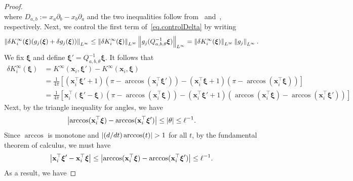 \begin{proof}
\begin{equation}
\end{equation}
where $D_{a,b} := x_a\partial_b - x_b\partial_a$ and the two inequalities follow from~\cite[Lem. 4.2.2 (iii)]{dai} and~\cite[Lem. 4.2.4]{dai}, respectively. Next, we control the first term of~\cref{eq.controlDelta} by writing
\begin{equation}\label{eq.Kterm0}
    \left\lVert\delta {K}_i^\infty(\boldsymbol{\xi}) (g_j(\boldsymbol{\xi}) + \delta g_j(\boldsymbol{\xi}))\right\rVert_{L^\infty} \leq \left\lVert\delta {K}_i^\infty(\boldsymbol{\xi})\right\rVert_{L^\infty} \left\lVert g_j(Q_{a,b,\theta}^{-1} \boldsymbol{\xi})\right\rVert_{L^\infty} = \left\lVert\delta {K}_i^\infty(\boldsymbol{\xi})\right\rVert_{L^\infty} \left\lVert g_j\right\rVert_{L^\infty}.
\end{equation}
We fix $\boldsymbol{\xi}$ and define $\boldsymbol{\xi}' = Q_{a,b,\theta}^{-1}\boldsymbol{\xi}$. It follows that
\begin{align*}
    \delta {K}_i^\infty(\boldsymbol{\xi}) &= {K}^\infty(\mathbf{x}_i, \boldsymbol{\xi}') - {K}^\infty(\mathbf{x}_i, \boldsymbol{\xi}) \\
    &= \frac{1}{4\pi}\! \left[(\mathbf{x}_i^\top \boldsymbol{\xi}'+1) \left(\pi \!-\! \arccos(\mathbf{x}_i^\top \boldsymbol{\xi}')\right) - (\mathbf{x}_i^\top \boldsymbol{\xi}+1) \left(\pi \!-\! \arccos(\mathbf{x}_i^\top \boldsymbol{\xi})\right)\right] \\
    &= \frac{1}{4\pi} \left[\mathbf{x}_i^\top (\boldsymbol{\xi}' - \boldsymbol{\xi}) \left(\pi \!-\! \arccos(\mathbf{x}_i^\top \boldsymbol{\xi})\right) - (\mathbf{x}_i^\top \boldsymbol{\xi}'+1) \left(\arccos(\mathbf{x}_i^\top \boldsymbol{\xi}) \!-\! \arccos(\mathbf{x}_i^\top \boldsymbol{\xi}')\right)\right]
\end{align*}
Next, by the triangle inequality for angles, we have
\begin{equation*}
    \left|\arccos(\mathbf{x}_i^\top \boldsymbol{\xi}) - \arccos(\mathbf{x}_i^\top \boldsymbol{\xi}')\right| \leq \left|\theta\right| \leq \ell^{-1}.
\end{equation*}
Since $\arccos$ is monotone and $\left|(d/dt)\arccos(t)\right| > 1$ for all $t$, by the fundamental theorem of calculus, we must have
\begin{equation*}
    \left|\mathbf{x}_i^\top \boldsymbol{\xi}' - \mathbf{x}_i^\top \boldsymbol{\xi}\right| \leq \left|\arccos(\mathbf{x}_i^\top \boldsymbol{\xi}) - \arccos(\mathbf{x}_i^\top \boldsymbol{\xi}')\right| \leq \ell^{-1}.
\end{equation*}
As a result, we have

\end{proof}
